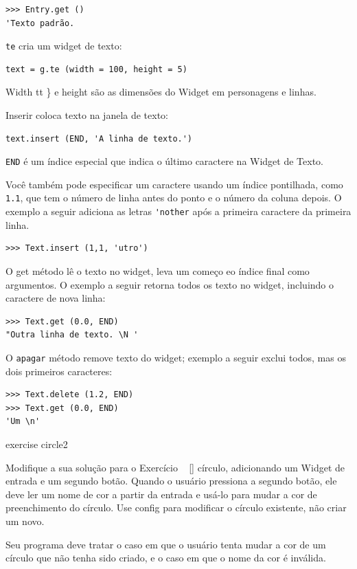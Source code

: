 \documentclass[10pt]{book}
\begin{document}
\begin{exercise}
\begin{v erbatim}
\begin{verbatim}
>>> Entry.get ()
'Texto padrão.
\end{verbatim}
%
{\tt te} cria um widget de texto:

\begin{verbatim}
text = g.te (width = 100, height = 5)
\end{verbatim}
%
{Width tt \} e {height \tt} são as dimensões do
Widget em personagens e linhas.

{Inserir \tt} coloca texto na janela de texto:

\begin{verbatim}
text.insert (END, 'A linha de texto.')
\end{verbatim}
%
{\tt END} é um índice especial que indica o último caractere na
Widget de Texto.

Você também pode especificar um caractere usando um índice pontilhada, como {\tt 1.1},
que tem o número de linha antes do ponto e o número da coluna depois.
O exemplo a seguir adiciona as letras \verb "'nother" após a primeira
caractere da primeira linha.

\begin{verbatim}
>>> Text.insert (1,1, 'utro')
\end{verbatim}
%
O {get \tt} método lê o texto no widget, leva um começo
eo índice final como argumentos. O exemplo a seguir retorna todos os
texto no widget, incluindo o caractere de nova linha:

\begin{verbatim}
>>> Text.get (0.0, END)
"Outra linha de texto. \N '
\end{verbatim}
%
O {\tt apagar} método remove texto do widget;
exemplo a seguir exclui todos, mas os dois primeiros caracteres:

\begin{verbatim}
>>> Text.delete (1.2, END)
>>> Text.get (0.0, END)
'Um \n'
\end{verbatim}
%

\begin{} exercise
\label{} circle2

Modifique a sua solução para o Exercício ~ \ref {} círculo, adicionando um
Widget de entrada e um segundo botão. Quando o usuário pressiona a
segundo botão, ele deve ler um nome de cor a partir da entrada e
usá-lo para mudar a cor de preenchimento do círculo. Use {config \tt}
para modificar o círculo existente, não criar um novo.

Seu programa deve tratar o caso em que o usuário tenta
mudar a cor de um círculo que não tenha sido criado, e
o caso em que o nome da cor é inválida.


\end{}}
\end{v erbatim}
\end{exercise}
\end{document}
